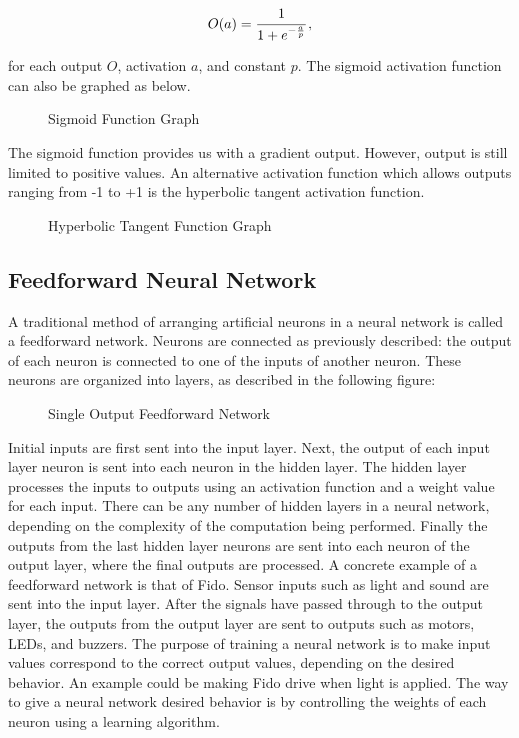 \begin{equation}
	O(a) = \cfrac{1}{1+e^{-\frac{a}{p}}}
	\,,
\end{equation}

\noindent for each output $O$, activation $a$, and constant $p$. The sigmoid activation function can also be graphed as below.

\begin{figure}[ht]
	\centering
	
	\caption{Sigmoid Function Graph}
\end{figure}

The sigmoid function provides us with a gradient output. However, output is still limited to positive values. An alternative activation function which allows outputs ranging from -1 to +1 is the hyperbolic tangent activation function.

\begin{figure}[ht]
	\centering
	
	\caption{Hyperbolic Tangent Function Graph}
\end{figure}

\subsection{Feedforward Neural Network}

A traditional method of arranging artificial neurons in a neural network is called a feedforward network. Neurons are connected as previously described: the output of each neuron is connected to one of the inputs of another neuron. These neurons are organized into layers, as described in the following figure: %

\begin{figure}[ht]
	\centering
	
	\caption{Single Output Feedforward Network}
\end{figure}

Initial inputs are first sent into the input layer. Next, the output of each input layer neuron is sent into each neuron in the hidden layer. The hidden layer processes the inputs to outputs using an activation function and a weight value for each input. There can be any number of hidden layers in a neural network, depending on the complexity of the computation being performed. Finally the outputs from the last hidden layer neurons are sent into each neuron of the output layer, where the final outputs are processed. A concrete example of a feedforward network is that of Fido. Sensor inputs such as light and sound are sent into the input layer. After the signals have passed through to the output layer, the outputs from the output layer are sent to outputs such as motors, LEDs, and buzzers.  The purpose of training a neural network is to make input values correspond to the correct output values, depending on the desired behavior. An example could be making Fido drive when light is applied. The way to give a neural network desired behavior is by controlling the weights of each neuron using a learning algorithm.